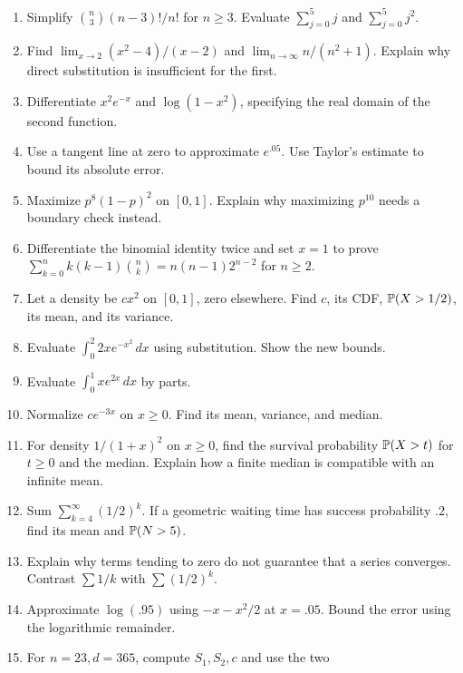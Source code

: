 \begin{exercisebox}
\begin{enumerate}
 \item Simplify $\binom n3(n-3)!/n!$ for $n\ge3$. Evaluate
 $\sum_{j=0}^{5}j$ and $\sum_{j=0}^{5}j^2$. 
 \item Find $\lim_{x\to2}(x^2-4)/(x-2)$ and
 $\lim_{n\to\infty}n/(n^2+1)$. Explain why direct substitution is
 insufficient for the first. 
 \item Differentiate $x^2e^{-x}$ and $\log(1-x^2)$, specifying
 the real domain of the second function. 
 \item Use a tangent line at zero to approximate $e^{.05}$.
 Use Taylor's estimate to bound its absolute error. 
 \item Maximize $p^8(1-p)^2$ on $[0,1]$. Explain why maximizing
 $p^{10}$ needs a boundary check instead. 
 \item Differentiate the binomial identity twice and set $x=1$
 to prove $\sum_{k=0}^n k(k-1)\binom nk=n(n-1)2^{n-2}$ for $n\ge2$.
 \item Let a density be $cx^2$ on $[0,1]$, zero elsewhere.
 Find $c$, its CDF, $\P(X>1/2)$, its mean, and its variance.
 \item Evaluate $\int_0^2 2x e^{-x^2}\,dx$ using substitution.
 Show the new bounds. 
 \item Evaluate $\int_0^1 x e^{2x}\,dx$ by parts.
 \item Normalize $c e^{-3x}$ on $x\ge0$. Find its mean, variance,
 and median. 
 \item For density $1/(1+x)^2$ on $x\ge0$, find the survival
 probability $\P(X>t)$ for $t\ge0$ and the median. Explain how a
 finite median is compatible with an infinite mean. 
 \item Sum $\sum_{k=4}^{\infty}(1/2)^k$. If a geometric waiting
 time has success probability $.2$, find its mean and
 $\P(N>5)$. 
 \item Explain why terms tending to zero do not guarantee that a
 series converges. Contrast $\sum 1/k$ with $\sum (1/2)^k$.
 \item Approximate $\log(.95)$ using $-x-x^2/2$ at $x=.05$.
 Bound the error using the logarithmic remainder. 
 \item For $n=23,d=365$, compute $S_1,S_2,c$ and use the two

\end{enumerate}
\end{exercisebox}
